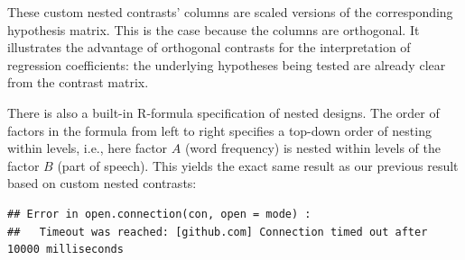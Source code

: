 \documentclass[12pt,]{krantz}
\newenvironment{Shaded}{\begin{snugshade}}{\end{snugshade}}
\newcommand{\DataTypeTok}[1]{\textcolor[rgb]{0.13,0.29,0.53}{#1}}
\newcommand{\DecValTok}[1]{\textcolor[rgb]{0.00,0.00,0.81}{#1}}
\newcommand{\FloatTok}[1]{\textcolor[rgb]{0.00,0.00,0.81}{#1}}
\newcommand{\KeywordTok}[1]{\textcolor[rgb]{0.13,0.29,0.53}{\textbf{#1}}}
\newcommand{\NormalTok}[1]{#1}
\newcommand{\OperatorTok}[1]{\textcolor[rgb]{0.81,0.36,0.00}{\textbf{#1}}}
\newcommand{\StringTok}[1]{\textcolor[rgb]{0.31,0.60,0.02}{#1}}
\theoremstyle{definition}
\theoremstyle{definition}
\theoremstyle{definition}
\theoremstyle{remark}
\begin{document}
These custom nested contrasts' columns are scaled versions of the corresponding hypothesis matrix. This is the case because the columns are orthogonal. It illustrates the advantage of orthogonal contrasts for the interpretation of regression coefficients: the underlying hypotheses being tested are already clear from the contrast matrix.

There is also a built-in R-formula specification of nested designs. The order of factors in the formula from left to right specifies a top-down order of nesting within levels, i.e., here factor \(A\) (word frequency) is nested within levels of the factor \(B\) (part of speech). This yields the exact same result as our previous result based on custom nested contrasts:

\begin{Shaded}
\end{Shaded}

\begin{verbatim}
## Error in open.connection(con, open = mode) : 
##   Timeout was reached: [github.com] Connection timed out after 10000 milliseconds
\end{verbatim}
\end{document}
